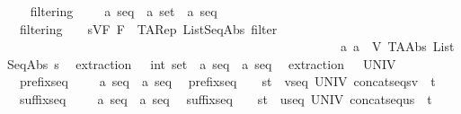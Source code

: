 \begin{isabellebody}
\ \isanewline
\ \ filtering\ \ \ \ {\isacharcolon}{\isacharcolon}\ {\isachardoublequoteopen}{\isacharparenleft}{\isacharprime}a\ seq\ {\isacharasterisk}\ {\isacharprime}a\ set{\isacharparenright}\ {\isacharless}{\isacharequal}{\isachargreater}\ {\isacharprime}a\ seq{\isachardoublequoteclose}\isanewline
\ \ {\isachardoublequoteopen}filtering\ \ \ {\isacharequal}{\isacharequal}\ {\isacharbraceleft}{\isacharparenleft}{\isacharparenleft}s{\isacharcomma}V{\isacharparenright}{\isacharcomma}F{\isacharparenright}{\isachardot}\ F\ {\isacharequal}\ TARep\ ListSeqAbs\ {\isacharparenleft}filter\isanewline
\ \ \ \ \ \ \ \ \ \ \ \ \ \ \ \ \ \ \ \ \ \ \ \ \ \ \ \ \ \ \ \ \ \ \ \ \ \ \ \ \ \ \ \ \ \ \ \ \ \ \ \ {\isacharparenleft}{\isacharpercent}\ a{\isachardot}\ a\ {\isacharcolon}\ V{\isacharparenright}\ {\isacharparenleft}TAAbs\ ListSeqAbs\ s{\isacharparenright}{\isacharparenright}{\isacharbraceright}{\isachardoublequoteclose}\isanewline
\isanewline
\ \ extraction\ \ \ {\isacharcolon}{\isacharcolon}{\isachardoublequoteopen}{\isacharparenleft}int\ set\ {\isacharasterisk}\ {\isacharprime}a\ seq{\isacharparenright}\ {\isacharless}{\isacharequal}{\isachargreater}\ {\isacharprime}a\ seq{\isachardoublequoteclose}\isanewline
\ \ {\isachardoublequoteopen}extraction\ \ {\isacharequal}{\isacharequal}\ UNIV{\isachardoublequoteclose}\ \ \ \isanewline
\isanewline
\ \ prefixseq\ \ \ \ {\isacharcolon}{\isacharcolon}\ {\isachardoublequoteopen}{\isacharprime}a\ seq\ {\isacharless}{\isacharequal}{\isachargreater}\ {\isacharprime}a\ seq{\isachardoublequoteclose}\isanewline
\ \ {\isachardoublequoteopen}prefixseq\ \ \ {\isacharequal}{\isacharequal}\ {\isacharbraceleft}{\isacharparenleft}s{\isacharcomma}t{\isacharparenright}{\isachardot}\ {\isacharquery}\ v{\isacharcolon}seq\ UNIV{\isachardot}\ {\isacharparenleft}concatseq{\isacharpercent}{\isacharcircum}{\isacharparenleft}s{\isacharcomma}v{\isacharparenright}{\isacharparenright}\ {\isacharequal}\ t{\isacharbraceright}{\isachardoublequoteclose}\isanewline
\ \ suffixseq\ \ \ \ {\isacharcolon}{\isacharcolon}\ {\isachardoublequoteopen}{\isacharprime}a\ seq\ {\isacharless}{\isacharequal}{\isachargreater}\ {\isacharprime}a\ seq{\isachardoublequoteclose}\isanewline
\ \ {\isachardoublequoteopen}suffixseq\ \ \ {\isacharequal}{\isacharequal}\ {\isacharbraceleft}{\isacharparenleft}s{\isacharcomma}t{\isacharparenright}{\isachardot}\ {\isacharquery}\ u{\isacharcolon}seq\ UNIV{\isachardot}\ {\isacharparenleft}concatseq{\isacharpercent}{\isacharcircum}{\isacharparenleft}u{\isacharcomma}s{\isacharparenright}{\isacharparenright}\ {\isacharequal}\ t{\isacharbraceright}{\isachardoublequoteclose}\isanewline

\end{isabellebody}

